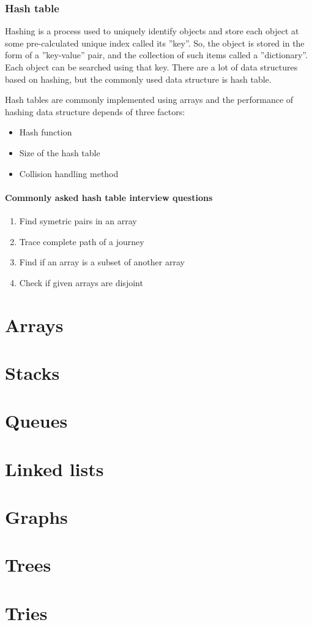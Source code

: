 \subsubsection{Hash table}
Hashing is a process used to uniquely identify objects and store each object at some pre-calculated unique index called its ''key''. So, the object is stored in the form of a ''key-value'' pair, and the collection of such items called a ''dictionary''. Each object can be searched using that key. There are a lot of data structures based on hashing, but the commonly used data structure is hash table.

Hash tables are commonly implemented using arrays and the performance of hashing data structure depends of three factors:
\begin{itemize}
    \item { Hash function }
    \item { Size of the hash table }
    \item { Collision handling method }
\end{itemize}

\paragraph{Commonly asked hash table interview questions}
\begin{enumerate}
    \item { Find symetric pairs in an array }
    \item { Trace complete path of a journey }
    \item { Find if an array is a subset of another array }
    \item { Check if given arrays are disjoint }
\end{enumerate}

\section{Arrays}


\section{Stacks}


\section{Queues}

\section{Linked lists}

\section{Graphs}

\section{Trees}

\section{Tries}
